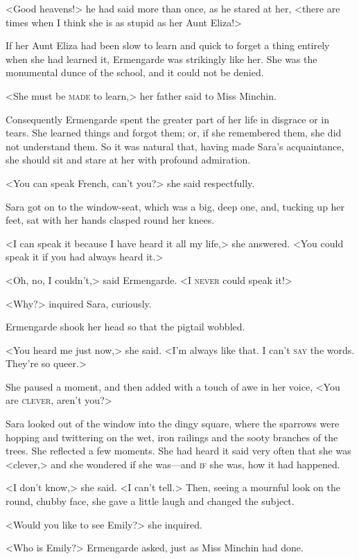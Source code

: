 <Good heavens!> he had said more than once, as he stared at her, <there are times when I think she is as stupid as her Aunt Eliza!>

If her Aunt Eliza had been slow to learn and quick to forget a thing entirely when she had learned it, Ermengarde was strikingly like her. She was the monumental dunce of the school, and it could not be denied.

<She must be \textsc{made} to learn,> her father said to Miss Minchin.

Consequently Ermengarde spent the greater part of her life in disgrace or in tears. She learned things and forgot them; or, if she remembered them, she did not understand them. So it was natural that, having made Sara's acquaintance, she should sit and stare at her with profound admiration.

<You can speak French, can't you?> she said respectfully.

Sara got on to the window-seat, which was a big, deep one, and, tucking up her feet, sat with her hands clasped round her knees.

<I can speak it because I have heard it all my life,> she answered. <You could speak it if you had always heard it.>

<Oh, no, I couldn't,> said Ermengarde. <I \textsc{never} could speak it!>

<Why?> inquired Sara, curiously.

Ermengarde shook her head so that the pigtail wobbled.

<You heard me just now,> she said. <I'm always like that. I can't \textsc{say} the words. They're so queer.>

She paused a moment, and then added with a touch of awe in her voice, <You are \textsc{clever}, aren't you?>

Sara looked out of the window into the dingy square, where the sparrows were hopping and twittering on the wet, iron railings and the sooty branches of the trees. She reflected a few moments. She had heard it said very often that she was <clever,> and she wondered if she was—and \textsc{if} she was, how it had happened.

<I don't know,> she said. <I can't tell.> Then, seeing a mournful look on the round, chubby face, she gave a little laugh and changed the subject.

<Would you like to see Emily?> she inquired.

<Who is Emily?> Ermengarde asked, just as Miss Minchin had done.

